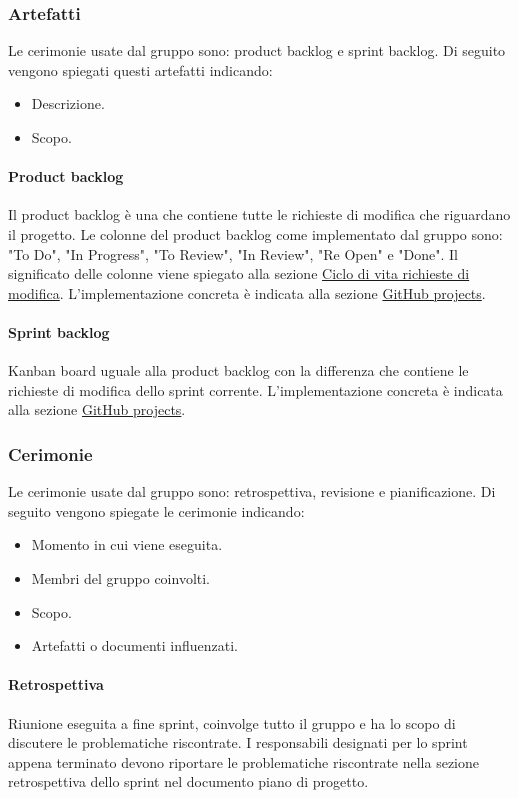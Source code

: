 \subsubsection{Artefatti}
Le cerimonie usate dal gruppo sono: product backlog e sprint backlog. 
Di seguito vengono spiegati questi artefatti indicando:
\begin{itemize}
    \item Descrizione.
    \item Scopo.
\end{itemize}

\paragraph{Product backlog}
Il product backlog è una  che contiene tutte le richieste di modifica che riguardano il progetto.
Le colonne del product backlog come implementato dal gruppo sono: "To Do", "In Progress", "To Review", "In Review", "Re Open" e "Done".
Il significato delle colonne viene spiegato alla sezione \hyperref[par:ciclo_vita_richieste_di_modifica]{Ciclo di vita richieste di modifica}.
L'implementazione concreta è indicata alla sezione \hyperref[subpar:project]{GitHub projects}.

\paragraph{Sprint backlog}
Kanban board uguale alla product backlog con la differenza che contiene le richieste di modifica dello sprint corrente.
L'implementazione concreta è indicata alla sezione \hyperref[subpar:project]{GitHub projects}.

\subsubsection{Cerimonie}
Le cerimonie usate dal gruppo sono: retrospettiva, revisione e pianificazione. 
Di seguito vengono spiegate le cerimonie indicando:
\begin{itemize}
    \item Momento in cui viene eseguita.
    \item Membri del gruppo coinvolti.
    \item Scopo.
    \item Artefatti o documenti influenzati.
\end{itemize}

\paragraph{Retrospettiva}
Riunione eseguita a fine sprint, coinvolge tutto il gruppo e ha lo scopo di discutere le problematiche riscontrate.
I responsabili designati per lo sprint appena terminato devono riportare le problematiche riscontrate nella sezione retrospettiva dello sprint nel documento piano di progetto.



